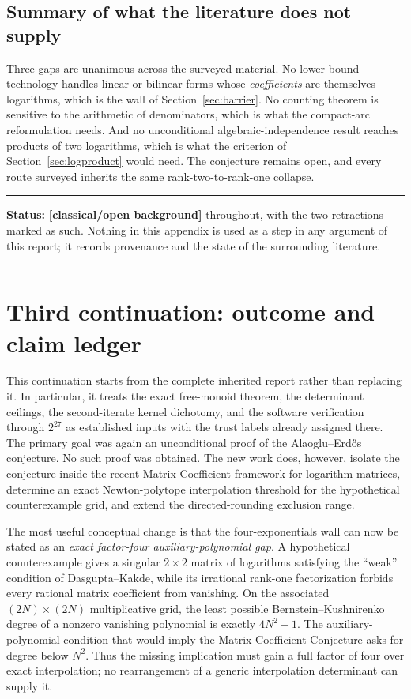 \documentclass[11pt,oneside]{article}
\theoremstyle{definition}
\theoremstyle{remark}
\newcommand{\statusknown}{\textcolor{classicalgray}{\textbf{[classical/open background]}}}
\newenvironment{statusbox}[1]
{\begin{center}\begin{minipage}{0.94\textwidth}\raggedright\hbadness=10000\hrule
\vspace{0.45em}\textbf{Status:} #1\par\vspace{0.35em}}
{\vspace{0.35em}\hrule\end{minipage}\end{center}}
\begin{document}
\subsection{Summary of what the literature does not supply}

Three gaps are unanimous across the surveyed material.  No lower-bound technology handles
linear or bilinear forms whose \emph{coefficients} are themselves logarithms, which is the wall
of Section~\ref{sec:barrier}.  No counting theorem is sensitive to the arithmetic of
denominators, which is what the compact-arc reformulation needs.  And no unconditional
algebraic-independence result reaches products of two logarithms, which is what the criterion
of Section~\ref{sec:logproduct} would need.  The conjecture remains open, and every route
surveyed inherits the same rank-two-to-rank-one collapse.

\begin{statusbox}{\statusknown{} throughout, with the two retractions marked as such.  Nothing
in this appendix is used as a step in any argument of this report; it records provenance and
the state of the surrounding literature.}
\end{statusbox}

\clearpage
\setcounter{section}{0}
\renewcommand{\thesection}{R\arabic{section}}

\section{Third continuation: outcome and claim ledger}
\label{sec:third-continuation}

This continuation starts from the complete inherited report rather than replacing it.  In
particular, it treats the exact free-monoid theorem, the determinant ceilings, the
second-iterate kernel dichotomy, and the software verification through $2^{27}$ as established
inputs with the trust labels already assigned there.  The primary goal was again an
unconditional proof of the Alaoglu--Erd\H{o}s conjecture.  No such proof was obtained.  The
new work does, however, isolate the conjecture inside the recent Matrix Coefficient framework
for logarithm matrices, determine an exact Newton-polytope interpolation threshold for the
hypothetical counterexample grid, and extend the directed-rounding exclusion range.

The most useful conceptual change is that the four-exponentials wall can now be stated as an
\emph{exact factor-four auxiliary-polynomial gap}.  A hypothetical counterexample gives a
singular $2\times2$ matrix of logarithms satisfying the ``weak'' condition of
Dasgupta--Kakde, while its irrational rank-one factorization forbids every rational matrix
coefficient from vanishing.  On the associated $(2N)\times(2N)$ multiplicative grid, the
least possible Bernstein--Kushnirenko degree of a nonzero vanishing polynomial is exactly
$4N^2-1$.  The auxiliary-polynomial condition that would imply the Matrix Coefficient
Conjecture asks for degree below $N^2$.  Thus the missing implication must gain a full factor
of four over exact interpolation; no rearrangement of a generic interpolation determinant can
supply it.
\end{document}
